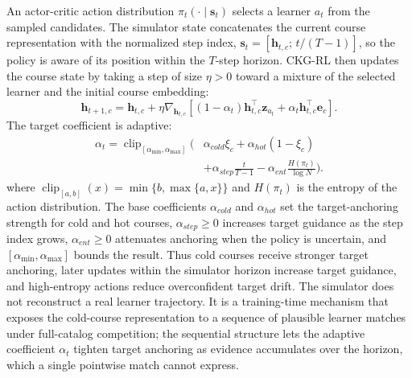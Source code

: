 \documentclass[letterpaper]{article}
\begin{document}
An actor-critic action distribution \(\pi_t(\cdot\mid\mathbf{s}_t)\) selects a learner \(a_t\) from the sampled candidates. The simulator state concatenates the current course representation with the normalized step index, \(\mathbf{s}_t=[\mathbf{h}_{t,c};\,t/(T-1)]\), so the policy is aware of its position within the \(T\)-step horizon. CKG-RL then updates the course state by taking a step of size \(\eta>0\) toward a mixture of the selected learner and the initial course embedding:
\begin{equation}
\mathbf{h}_{t+1,c}=\mathbf{h}_{t,c}+\eta
\nabla_{\mathbf{h}_{t,c}}
\left[
(1-\alpha_t)\mathbf{h}_{t,c}^\top\mathbf{z}_{a_t}
+\alpha_t\mathbf{h}_{t,c}^\top\mathbf{e}_c
\right].
\end{equation}
The target coefficient is adaptive:
\begin{align}
\alpha_t=
\operatorname{clip}_{[\alpha_{\min},\alpha_{\max}]}\Big(
&\alpha_{cold}\xi_c+\alpha_{hot}(1-\xi_c) \nonumber\\
&+\alpha_{step}\frac{t}{T-1}
-\alpha_{ent}\frac{H(\pi_t)}{\log N}
\Big).
\end{align}
where \(\operatorname{clip}_{[a,b]}(x)=\min\{b,\max\{a,x\}\}\) and \(H(\pi_t)\) is the entropy of the action distribution. The base coefficients \(\alpha_{cold}\) and \(\alpha_{hot}\) set the target-anchoring strength for cold and hot courses, \(\alpha_{step}\ge0\) increases target guidance as the step index grows, \(\alpha_{ent}\ge0\) attenuates anchoring when the policy is uncertain, and \([\alpha_{\min},\alpha_{\max}]\) bounds the result.
Thus cold courses receive stronger target anchoring, later updates within the simulator horizon increase target guidance, and high-entropy actions reduce overconfident target drift. The simulator does not reconstruct a real learner trajectory. It is a training-time mechanism that exposes the cold-course representation to a sequence of plausible learner matches under full-catalog competition; the sequential structure lets the adaptive coefficient \(\alpha_t\) tighten target anchoring as evidence accumulates over the horizon, which a single pointwise match cannot express.
\end{document}
